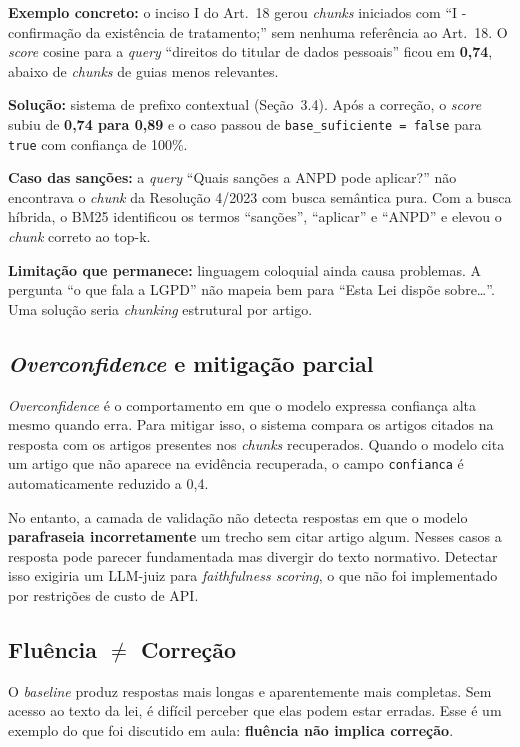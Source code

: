 \documentclass[
  12pt,
  a4paper,
  brazil,
  article,
  oneside,
  sumario=tradicional
]{abntex2}
\begin{document}
\textbf{Exemplo concreto:} o inciso I do Art.~18 gerou \textit{chunks} iniciados com
``I - confirmação da existência de tratamento;'' sem nenhuma referência ao Art.~18. O
\textit{score} cosine para a \textit{query} ``direitos do titular de dados pessoais''
ficou em \textbf{0,74}, abaixo de \textit{chunks} de guias menos relevantes.

\textbf{Solução:} sistema de prefixo contextual (Seção~3.4). Após a correção, o
\textit{score} subiu de \textbf{0,74 para 0,89} e o caso passou de
\texttt{base\_suficiente = false} para \texttt{true} com confiança de 100\%.

\textbf{Caso das sanções:} a \textit{query} ``Quais sanções a ANPD pode aplicar?''
não encontrava o \textit{chunk} da Resolução 4/2023 com busca semântica pura. Com a
busca híbrida, o BM25 identificou os termos ``sanções'', ``aplicar'' e ``ANPD'' e
elevou o \textit{chunk} correto ao top-k.

\textbf{Limitação que permanece:} linguagem coloquial ainda causa problemas. A
pergunta ``o que fala a LGPD'' não mapeia bem para ``Esta Lei dispõe sobre\ldots''.
Uma solução seria \textit{chunking} estrutural por artigo.

\subsection{\textit{Overconfidence} e mitigação parcial}

\textit{Overconfidence} é o comportamento em que o modelo expressa confiança alta
mesmo quando erra. Para mitigar isso, o sistema compara os artigos citados na resposta
com os artigos presentes nos \textit{chunks} recuperados. Quando o modelo cita um
artigo que não aparece na evidência recuperada, o campo \texttt{confianca} é
automaticamente reduzido a 0,4.

No entanto, a camada de validação não detecta respostas em que o modelo
\textbf{parafraseia incorretamente} um trecho sem citar artigo algum. Nesses casos a
resposta pode parecer fundamentada mas divergir do texto normativo. Detectar isso
exigiria um LLM-juiz para \textit{faithfulness scoring}, o que não foi implementado
por restrições de custo de API.

\subsection{Fluência $\neq$ Correção}

O \textit{baseline} produz respostas mais longas e aparentemente mais completas. Sem
acesso ao texto da lei, é difícil perceber que elas podem estar erradas. Esse é um
exemplo do que foi discutido em aula: \textbf{fluência não implica correção}.
\end{document}
